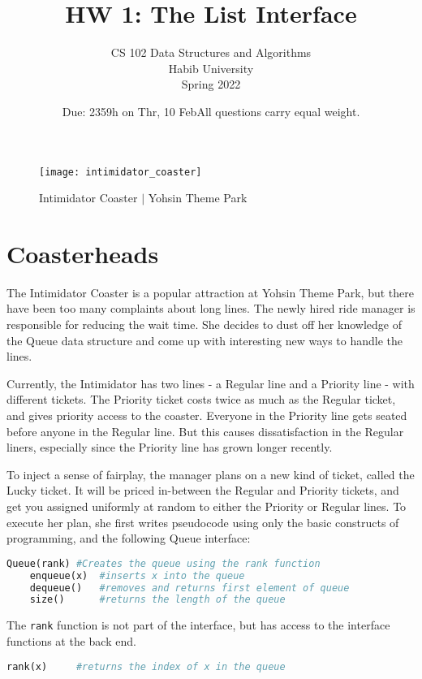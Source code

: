 \documentclass[addpoints]{exam}
\title{HW 1: The List Interface}
\author{CS 102 Data Structures and Algorithms\\Habib University\\Spring 2022}
\date{Due: 2359h on Thr, 10 Feb}
\date{All questions carry equal weight.}
\begin{document}
	\maketitle
	
	\begin{figure}[h]
		\centering
		\texttt{[image: intimidator\_coaster]}
		\caption{Intimidator Coaster $|$ Yohsin Theme Park}
		\label{fig:intimidator_coaster}
	\end{figure}
	
	
	\section{Coasterheads}
	
	The Intimidator Coaster is a popular attraction at Yohsin Theme Park, but there have been too many complaints about long lines. The newly hired ride manager is responsible for reducing the wait time. She decides to dust off her knowledge of the Queue data structure and come up with interesting new ways to handle the lines. 
	
	Currently, the Intimidator has two lines -  a Regular line and a Priority line - with different tickets. The Priority ticket costs twice as much as the Regular ticket, and gives priority access to the coaster. Everyone in the Priority line gets seated before anyone in the Regular line. But this causes dissatisfaction in the Regular liners, especially since the Priority line has grown longer recently. 
	
	To inject a sense of fairplay, the manager plans on a new kind of ticket, called the Lucky ticket. It will be priced in-between the Regular and Priority tickets, and get you assigned uniformly at random to either the Priority or Regular lines. To execute her plan, she first writes pseudocode using only the basic constructs of programming, and the following Queue interface:
	
	
	\begin{lstlisting}[language=Python, caption=Queue Interface]
	Queue(rank) #Creates the queue using the rank function
	enqueue(x)  #inserts x into the queue
	dequeue()   #removes and returns first element of queue
	size()      #returns the length of the queue\end{lstlisting}
	
	The \texttt{rank} function is not part of the interface, but has access to the interface functions at the back end.
	
	\begin{lstlisting}[language=Python]
	rank(x)     #returns the index of x in the queue\end{lstlisting}
	
\end{document}
